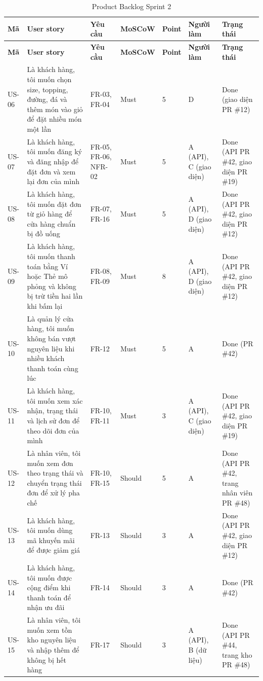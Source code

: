 {\footnotesize
\begin{longtable}{@{}L{1.1cm}L{4.3cm}L{1.7cm}L{1.6cm}L{0.9cm}L{1.7cm}L{2.6cm}@{}}
\caption{Product Backlog Sprint 2}\label{tab:backlogs2}\\
\toprule
\textbf{Mã} & \textbf{User story} & \textbf{Yêu cầu} & \textbf{MoSCoW} & \textbf{Point} & \textbf{Người làm} & \textbf{Trạng thái} \\ \midrule \endfirsthead
\toprule \textbf{Mã} & \textbf{User story} & \textbf{Yêu cầu} & \textbf{MoSCoW} & \textbf{Point} & \textbf{Người làm} & \textbf{Trạng thái} \\ \midrule \endhead
\bottomrule \endfoot
US-06 & Là khách hàng, tôi muốn chọn size, topping, đường, đá và thêm món vào giỏ để đặt nhiều món một lần & FR-03, FR-04 & Must & 5 & D & Done (giao diện PR \#12) \\
US-07 & Là khách hàng, tôi muốn đăng ký và đăng nhập để đặt đơn và xem lại đơn của mình & FR-05, FR-06, NFR-02 & Must & 5 & A (API), C (giao diện) & Done (API PR \#42, giao diện PR \#19) \\
US-08 & Là khách hàng, tôi muốn đặt đơn từ giỏ hàng để cửa hàng chuẩn bị đồ uống & FR-07, FR-16 & Must & 5 & A (API), D (giao diện) & Done (API PR \#42, giao diện PR \#12) \\
US-09 & Là khách hàng, tôi muốn thanh toán bằng Ví hoặc Thẻ mô phỏng và không bị trừ tiền hai lần khi bấm lại & FR-08, FR-09 & Must & 8 & A (API), D (giao diện) & Done (API PR \#42, giao diện PR \#12) \\
US-10 & Là quản lý cửa hàng, tôi muốn không bán vượt nguyên liệu khi nhiều khách thanh toán cùng lúc & FR-12 & Must & 5 & A & Done (PR \#42) \\
US-11 & Là khách hàng, tôi muốn xem xác nhận, trạng thái và lịch sử đơn để theo dõi đơn của mình & FR-10, FR-11 & Must & 3 & A (API), C (giao diện) & Done (API PR \#42, giao diện PR \#19) \\
US-12 & Là nhân viên, tôi muốn xem đơn theo trạng thái và chuyển trạng thái đơn để xử lý pha chế & FR-10, FR-15 & Should & 5 & A & Done (API PR \#42, trang nhân viên PR \#48) \\
US-13 & Là khách hàng, tôi muốn dùng mã khuyến mãi để được giảm giá & FR-13 & Should & 3 & A & Done (API PR \#42, giao diện PR \#12) \\
US-14 & Là khách hàng, tôi muốn được cộng điểm khi thanh toán để nhận ưu đãi & FR-14 & Should & 3 & A & Done (PR \#42) \\
US-15 & Là nhân viên, tôi muốn xem tồn kho nguyên liệu và nhập thêm để không bị hết hàng & FR-17 & Should & 3 & A (API), B (dữ liệu) & Done (API PR \#44, trang kho PR \#48) \\

\end{longtable}}
